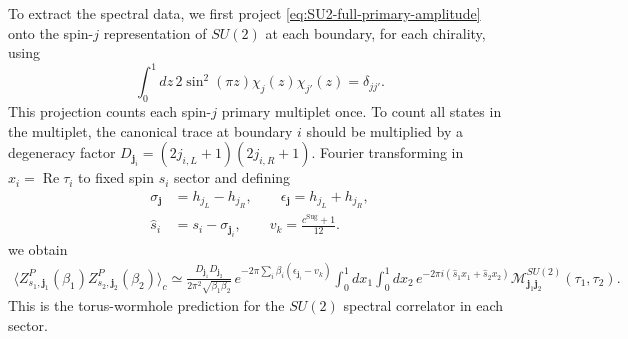 \documentclass[11pt]{article}
\numberwithin{equation}{section}
\begin{document}
To extract the spectral data, we first project \eqref{eq:SU2-full-primary-amplitude} onto the spin-$j$ representation of $SU(2)$ at each boundary, for each chirality, using
\begin{equation}
\int_0^1 dz\,2\sin^2(\pi z)\chi_j(z)\chi_{j'}(z)=\delta_{jj'}.
\end{equation}
This projection counts each  spin-$j$ primary multiplet once. To count all states in the multiplet,  the canonical trace at boundary $i$ should be multiplied by a degeneracy factor $D_{\mathbf j_i}=(2j_{i,L}+1)(2j_{i,R}+1)$.  Fourier transforming in $x_i=\operatorname{Re}\tau_i$ to fixed spin $s_i$ sector and defining
\begin{equation}
\begin{aligned}
 \sigma_{\mathbf j}&=h_{j_L}-h_{j_R},\qquad
 \epsilon_{\mathbf j}=h_{j_L}+h_{j_R},\\
 \hat s_i&=s_i-\sigma_{\mathbf j_i},\qquad
 v_k=\frac{c^{\mathrm{Sug}}+1}{12}.
 \label{eq:SU2_parameter}
\end{aligned}
\end{equation}
we obtain
\begin{equation}
\begin{aligned}
\langle Z^P_{s_1,\mathbf j_1}(\beta_1) Z^P_{s_2,\mathbf j_2}(\beta_2)\rangle_c \simeq
\frac{D_{\mathbf j_1}D_{\mathbf j_2}}
 {2\pi^2\sqrt{\beta_1\beta_2}}\,
 e^{-2\pi\sum_i\beta_i(\epsilon_{\mathbf j_i}-v_k)}
 \int_0^1 dx_1\int_0^1 dx_2\,
 e^{-2\pi i(\hat s_1x_1+\hat s_2x_2)}
 \mathcal M^{SU(2)}_{\mathbf j_1\mathbf j_2}(\tau_1,\tau_2).
\end{aligned}
\label{eq:SU2-full-sector-correlator}
\end{equation}
This is the torus-wormhole prediction for the $SU(2)$ spectral correlator in each
sector. 
\end{document}
